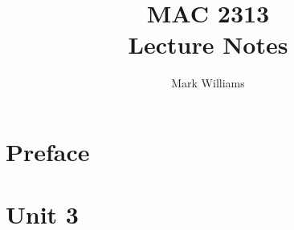 \documentclass{report}
\title{\Huge{MAC 2313}\\Lecture Notes}
\author{\huge{Mark Williams}}
\date{}
\begin{document}
\maketitle
\newpage
{}
\tableofcontents
\pagebreak

\chapter{Preface}

\pagebreak
\chapter{Unit 3}

\end{document}

